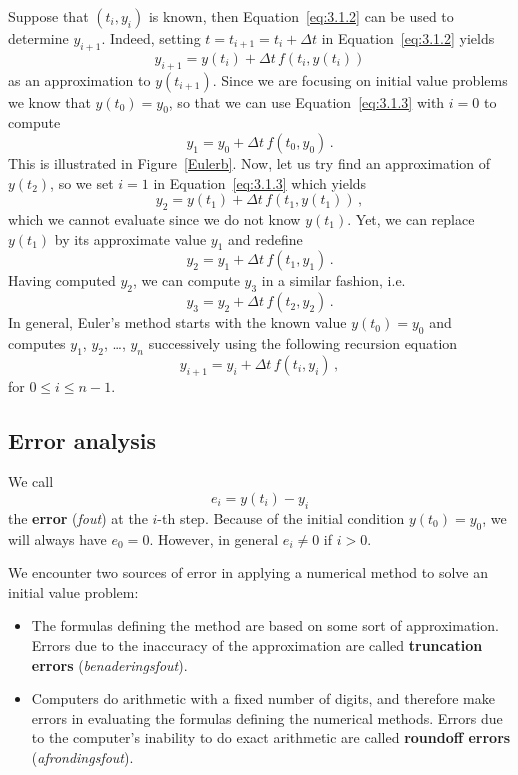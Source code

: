 Suppose that $(t_i,y_i)$ is known, then Equation~\eqref{eq:3.1.2} can be used to determine $y_{i+1}$. Indeed, setting $t=t_{i+1}=t_i+\Delta t$ in Equation~\eqref{eq:3.1.2} yields
\begin{equation} \label{eq:3.1.3}
y_{i+1}=y(t_i)+\Delta t\,f(t_i,y(t_i))
\end{equation}
as an approximation to $y(t_{i+1})$. Since we are focusing on initial value problems we know that $y(t_0)=y_0$, so that we
can use Equation~\eqref{eq:3.1.3} with $i=0$ to compute
$$
y_1=y_0+\Delta t\,f(t_0,y_0)\,.
$$
This is illustrated in Figure~\ref{Eulerb}. Now, let us try find an approximation of $y(t_2)$, so we set $i=1$ in Equation~\eqref{eq:3.1.3} which yields
$$
y_2=y(t_1)+\Delta t\,f(t_1,y(t_1))\,,
$$
which we cannot evaluate since we do not know $y(t_1)$. Yet, we can replace $y(t_1)$ by its approximate value $y_1$ and redefine
$$
y_2=y_1+\Delta t\,f(t_1,y_1)\,.
$$
Having computed $y_2$, we can  compute $y_3$ in a similar fashion, i.e.
$$
y_3=y_2+\Delta t\,f(t_2,y_2)\,.
$$
In general, Euler's method starts with the known value $y(t_0)=y_0$ and computes $y_1$, $y_2$, \dots, $y_n$ successively using the following recursion equation 
\begin{equation} \label{eq:3.1.4}
y_{i+1}=y_i+\Delta t\,f(t_i,y_i)\,,
\end{equation}
for $0\le i\le n-1$.
 






\subsection{Error analysis}\label{secError}

We call 
$$
e_i=y(t_i)-y_i
$$
the \textbf{error} (\textit{fout}) at the $i$-th step. Because of the initial condition $y(t_0)=y_0$, we will always have $e_0=0$. However, in general
$e_i\ne0$ if $i>0$.

We encounter two sources of error in applying a numerical method to solve an initial value problem:
\begin{itemize}
\item
The formulas defining the method are based on some sort of
approximation. Errors due to the inaccuracy of the approximation are
called \textbf{truncation errors} (\textit{benaderingsfout}).
\item
Computers do arithmetic with a fixed number of digits, and therefore
make errors in evaluating the formulas defining the numerical methods.
Errors due to the computer's inability to do exact arithmetic are
called \textbf{roundoff errors} (\textit{afrondingsfout}).
\end{itemize}


